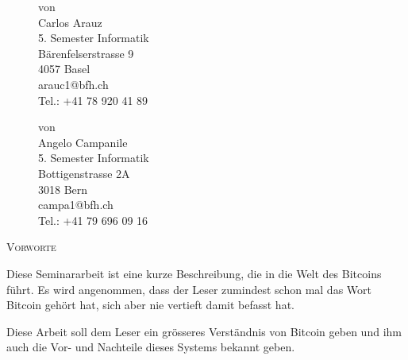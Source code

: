 \documentclass[a4paper, 11pt, DIV11, BCOR5mm]{scrartcl}
\begin{document}
\begin{titlepage}
\begin{figure}[!hb]
        \begin{minipage}[t][][b]{0.4\textwidth}
            von\\
            Carlos Arauz\\
            5. Semester Informatik\\
            Bärenfelserstrasse 9\\
            4057 Basel\\
            arauc1@bfh.ch\\
            Tel.: +41 78 920 41 89
        \end{minipage}
        \begin{minipage}[t][][b]{0.4\textwidth}
            {\color{white}von}\\
            Angelo Campanile\\
            5. Semester Informatik\\
            Bottigenstrasse 2A\\
            3018 Bern\\
            campa1@bfh.ch\\
            Tel.: +41 79 696 09 16
        \end{minipage}
    \end{figure}
\end{titlepage}
\newpage

\setcounter{page}{2}        %

\noindent
{\scshape\LARGE Vorworte \par}
\vspace{10mm}
\noindent
\justify
Diese Seminararbeit ist eine kurze Beschreibung, die in die Welt des Bitcoins führt.
Es wird angenommen, dass der Leser zumindest schon mal das Wort Bitcoin gehört hat,
sich aber nie vertieft damit befasst hat.

\noindent
Diese Arbeit soll dem Leser ein grösseres Verständnis von Bitcoin geben und ihm auch die
Vor- und Nachteile dieses Systems bekannt geben.

\newpage
\end{document}
